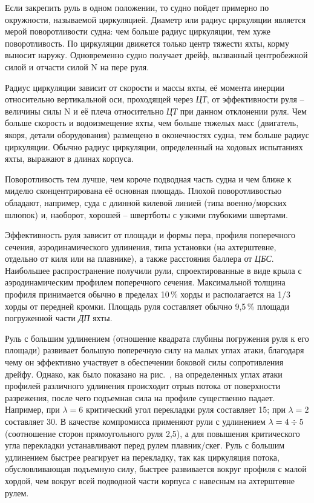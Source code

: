 Если закрепить руль в одном положении, то судно пойдет примерно по окружности, называемой циркуляцией. Диаметр или радиус циркуляции является мерой поворотливости судна: чем больше радиус циркуляции, тем хуже поворотливость. По циркуляции движется только центр тяжести яхты, корму выносит наружу. Одновременно судно получает дрейф, вызванный центробежной силой и отчасти силой \ve N на пере руля.

Радиус циркуляции зависит от скорости и массы яхты, её момента инерции относительно вертикальной оси, проходящей через \textit{ЦТ}, от эффективности руля \--- величины силы \ve N и её плеча относительно \textit{ЦТ} при данном отклонении руля. Чем больше скорость и водоизмещение яхты, чем больше тяжелых масс (двигатель, якоря, детали оборудования) размещено в оконечностях судна, тем больше радиус циркуляции. Обычно радиус циркуляции, определенный на ходовых испытаниях яхты, выражают в длинах корпуса.

Поворотливость тем лучше, чем короче подводная часть судна и чем ближе к миделю сконцентрирована её основная площадь. Плохой поворотливостью обладают, например, суда с длинной килевой линией (типа военно\-/морских шлюпок) и, наоборот, хорошей \--- швертботы с узкими глубокими швертами. 

Эффективность руля зависит от площади и формы пера, профиля поперечного сечения, аэродинамического удлинения, типа установки (на ахтерштевне, отдельно от киля или на плавнике), а также расстояния баллера от \textit{ЦБС}. Наибольшее распространение получили рули, спроектированные в виде крыла с аэродинамическим профилем поперечного сечения. Максимальной толщина профиля принимается обычно в пределах 10\,\% хорды и располагается на 1/3 хорды от передней кромки. Площадь руля составляет обычно 9,5\,\% площади погруженной части \textit{ДП} яхты. 

Руль с большим удлинением (отношение квадрата глубины погружения руля к его площади) развивает большую поперечную силу на малых углах атаки, благодаря чему он эффективно участвует в обеспечении боковой силы сопротивления дрейфу. Однако, как было показано на рис.~, на определенных углах атаки профилей различного удлинения происходит отрыв потока от поверхности разрежения, после чего подъемная сила на профиле существенно падает. Например, при $\lambda = 6$ критический угол перекладки руля составляет 15\gr; при $\lambda = 2$ составляет 30\gr. В качестве компромисса применяют рули с удлинением $\lambda = 4 \div 5$ (соотношение сторон прямоугольного руля 2,5), а для повышения критического угла перекладки устанавливают перед рулем плавник\-/скег. Руль с большим удлинением быстрее реагирует на перекладку, так как циркуляция потока, обусловливающая подъемную силу, быстрее развивается вокруг профиля с малой хордой, чем вокруг всей подводной части корпуса с навесным на ахтерштевне рулем. 


